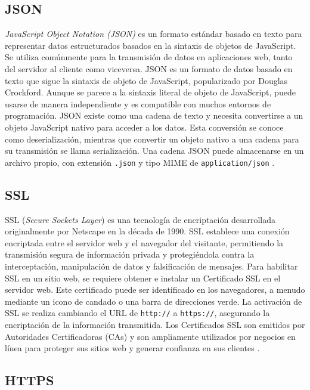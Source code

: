 \subsection{JSON}
\textit{JavaScript Object Notation (JSON)} es un formato estándar basado en texto
para representar datos estructurados basados en la sintaxis de objetos de JavaScript.
Se utiliza comúnmente para la transmisión de datos en aplicaciones web, tanto del
servidor al cliente como viceversa. JSON es un formato de datos basado en texto
que sigue la sintaxis de objeto de JavaScript, popularizado por Douglas Crockford.
Aunque se parece a la sintaxis literal de objeto de JavaScript, puede
usarse de manera independiente y es compatible con muchos entornos de
programación. JSON existe como una cadena de texto y necesita convertirse a
un objeto JavaScript nativo para acceder a los datos. Esta conversión se conoce
como deserialización, mientras que convertir un objeto nativo a una cadena para
su transmisión se llama serialización. Una cadena JSON puede almacenarse en un
archivo propio, con extensión \texttt{.json} y tipo MIME de \texttt{application/json}
\cite{MDN_Web_Docs_JSON}.

\subsection{SSL}
SSL (\textit{Secure Sockets Layer}) es una tecnología de encriptación desarrollada
originalmente por Netscape en la década de 1990. SSL establece una conexión
encriptada entre el servidor web y el navegador del visitante, permitiendo la
transmisión segura de información privada y protegiéndola contra la interceptación,
manipulación de datos y falsificación de mensajes. Para habilitar SSL en un sitio
web, se requiere obtener e instalar un Certificado SSL en el servidor web. Este
certificado puede ser identificado en los navegadores, a menudo mediante un icono
de candado o una barra de direcciones verde. La activación de SSL se realiza
cambiando el URL de \texttt{http://} a \texttt{https://}, asegurando la
encriptación de la información transmitida. Los Certificados SSL son emitidos
por Autoridades Certificadoras (CAs) y son ampliamente utilizados por negocios
en línea para proteger sus sitios web y generar confianza en sus clientes
\cite{SSL_Shopper_SSL}.

\subsection{HTTPS}

